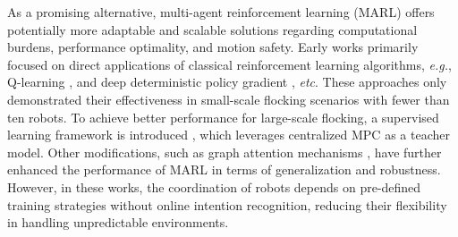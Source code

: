 

As a promising alternative, multi-{agent} reinforcement learning (MARL) offers potentially more adaptable and scalable solutions regarding computational burdens, performance optimality, and motion safety. Early works primarily focused on direct applications of classical reinforcement learning algorithms, \emph{e.g.}, Q-learning %
\cite{hung_q-learning_2017}, and deep deterministic policy gradient \cite{wang_deep_2018}, \emph{etc}. These approaches only demonstrated their effectiveness in small-scale flocking scenarios with fewer than ten robots. To achieve better performance for large-scale flocking, a supervised learning framework is introduced \cite{roy_neural_2020}, which leverages centralized MPC as a teacher model.  Other modifications, such as 
graph attention mechanisms \cite{xiao_graph_2023}, have further enhanced the performance of MARL in terms of generalization and robustness. 
However, in these works, the coordination of robots depends on pre-defined training strategies without online intention recognition, reducing their flexibility in handling unpredictable environments.


